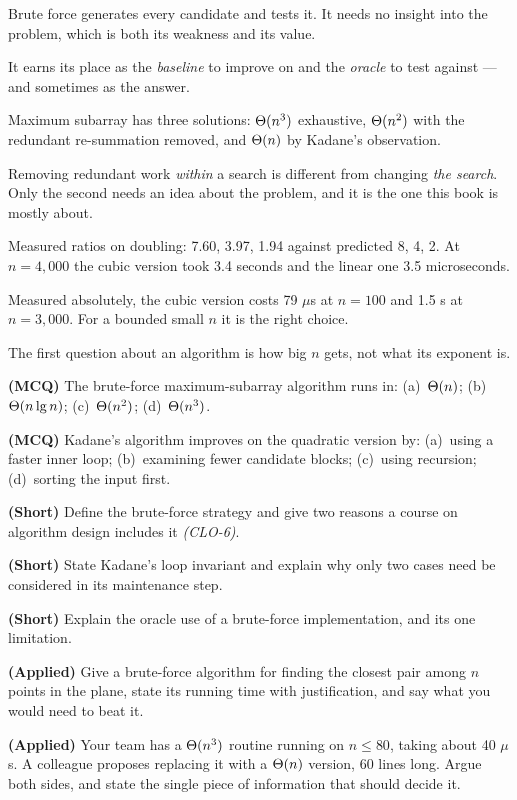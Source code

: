 \begin{chaptersummary}
\begin{tight}
  \item Brute force generates every candidate and tests it. It needs no insight
        into the problem, which is both its weakness and its value.
  \item It earns its place as the \emph{baseline} to improve on and the
        \emph{oracle} to test against --- and sometimes as the answer.
  \item Maximum subarray has three solutions: $\Theta(n^{3})$ exhaustive,
        $\Theta(n^{2})$ with the redundant re-summation removed, and
        $\Theta(n)$ by Kadane's observation.
  \item Removing redundant work \emph{within} a search is different from
        changing \emph{the search}. Only the second needs an idea about the
        problem, and it is the one this book is mostly about.
  \item Measured ratios on doubling: 7.60, 3.97, 1.94 against predicted 8, 4,
        2. At $n = 4{,}000$ the cubic version took 3.4 seconds and the linear
        one 3.5 microseconds.
  \item Measured absolutely, the cubic version costs 79 $\mu$s at $n = 100$ and
        1.5 s at $n = 3{,}000$. For a bounded small $n$ it is the right choice.
  \item The first question about an algorithm is how big $n$ gets, not what its
        exponent is.
\end{tight}
\end{chaptersummary}

\begin{reviewq}
  \item \textbf{(MCQ)} The brute-force maximum-subarray algorithm runs in:
        (a)~$\Theta(n)$; (b)~$\Theta(n\operatorname{lg} n)$; (c)~$\Theta(n^{2})$;
        (d)~$\Theta(n^{3})$.
  \item \textbf{(MCQ)} Kadane's algorithm improves on the quadratic version by:
        (a)~using a faster inner loop; (b)~examining fewer candidate blocks;
        (c)~using recursion; (d)~sorting the input first.
  \item \textbf{(Short)} Define the brute-force strategy and give two reasons a
        course on algorithm design includes it \emph{(CLO-6)}.
  \item \textbf{(Short)} State Kadane's loop invariant and explain why only two
        cases need be considered in its maintenance step.
  \item \textbf{(Short)} Explain the oracle use of a brute-force
        implementation, and its one limitation.
  \item \textbf{(Applied)} Give a brute-force algorithm for finding the closest
        pair among $n$ points in the plane, state its running time with
        justification, and say what you would need to beat it.
  \item \textbf{(Applied)} Your team has a $\Theta(n^{3})$ routine running on
        $n \le 80$, taking about 40 $\mu$s. A colleague proposes replacing it
        with a $\Theta(n)$ version, 60 lines long. Argue both sides, and state
        the single piece of information that should decide it.
\end{reviewq}
